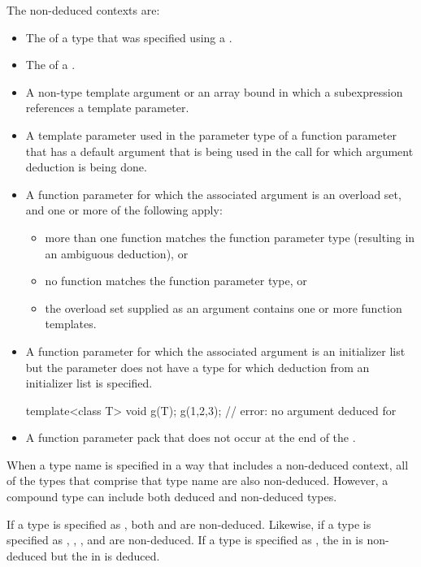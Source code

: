 \pnum
The non-deduced contexts are:

%
\begin{itemize}
\item
The
of a type that was specified using a
.
\item
The  of a .
\item
A non-type template argument or an array bound in which a subexpression
references a template parameter.
\item
A template parameter used in the parameter type of a function parameter that
has a default argument that is being used in the call for which argument
deduction is being done.
\item
A function parameter for which the associated argument is an
overload set, and one or more of the following apply:
\begin{itemize}
\item
more than one function matches the function parameter type (resulting in
an ambiguous deduction), or
\item
no function matches the function parameter type, or
\item
the overload set supplied as an argument contains one or more function templates.
\end{itemize}
\item A function parameter for which the associated argument is an initializer
list but the parameter does not have
a type for which deduction from an initializer list is specified.
\begin{example}
\begin{codeblock}
template<class T> void g(T);
g({1,2,3});                 // error: no argument deduced for 
\end{codeblock}
\end{example}
\item A function parameter pack that does not occur at the end of the
.
\end{itemize}

\pnum
When a type name is specified in a way that includes a non-deduced
context, all of the types that comprise that type name are also
non-deduced.
However, a compound type can include both deduced and non-deduced types.
\begin{example}
If a type is specified as
,
both
and
are non-deduced.
Likewise, if a type is specified as
,
,
,
and
are non-deduced.
If a type is specified as
,
the
in
is non-deduced but
the
in
is deduced.
\end{example}

